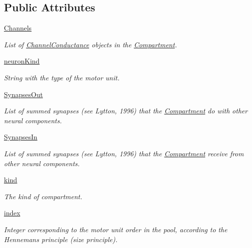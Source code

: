 \subsection*{Public Attributes}
\begin{DoxyCompactItemize}
\item 
\hyperlink{class_compartment_1_1_compartment_aa444563be9598d7cc54fd8d10ea6a04f}{Channels}
\begin{DoxyCompactList}\small\item\em List of \hyperlink{namespace_channel_conductance}{Channel\+Conductance} objects in the \hyperlink{class_compartment_1_1_compartment}{Compartment}. \end{DoxyCompactList}\item 
\hyperlink{class_compartment_1_1_compartment_ad42f32769afd94d1e7d7d54008efb6fa}{neuron\+Kind}
\begin{DoxyCompactList}\small\item\em String with the type of the motor unit. \end{DoxyCompactList}\item 
\hyperlink{class_compartment_1_1_compartment_a85d64ebf548276c873501d2dc3489ceb}{Synapses\+Out}
\begin{DoxyCompactList}\small\item\em List of summed synapses (see Lytton, 1996) that the \hyperlink{class_compartment_1_1_compartment}{Compartment} do with other neural components. \end{DoxyCompactList}\item 
\hyperlink{class_compartment_1_1_compartment_abe41aff3bffed80f4b848bd14763d506}{Synapses\+In}
\begin{DoxyCompactList}\small\item\em List of summed synapses (see Lytton, 1996) that the \hyperlink{class_compartment_1_1_compartment}{Compartment} receive from other neural components. \end{DoxyCompactList}\item 
\hyperlink{class_compartment_1_1_compartment_a74f2266a2231c4a81cc680bc201f0ffd}{kind}
\begin{DoxyCompactList}\small\item\em The kind of compartment. \end{DoxyCompactList}\item 
\hyperlink{class_compartment_1_1_compartment_a9402ef46ede52521ebbb9e9d2d68d631}{index}
\begin{DoxyCompactList}\small\item\em Integer corresponding to the motor unit order in the pool, according to the Henneman\textquotesingle{}s principle (size principle). \end{DoxyCompactList}\item 

\end{DoxyCompactItemize}
